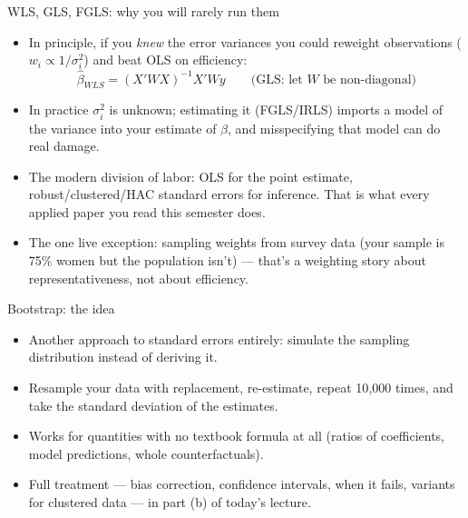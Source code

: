 \documentclass[aspectratio=169,11pt]{beamer}
\begin{document}
\begin{frame}{WLS, GLS, FGLS: why you will rarely run them}
\begin{itemize}
	\item In principle, if you \emph{knew} the error variances you could reweight
	observations ($w_i \propto 1/\sigma_i^2$) and beat OLS on efficiency:\[
	\widehat{\beta}_{WLS} = (X' W X)^{-1} X' W y
	\qquad \text{(GLS: let $W$ be non-diagonal)}
	\]

	\item In practice $\sigma_i^2$ is unknown; estimating it (FGLS/IRLS) imports a
	model of the variance into your estimate of $\beta$, and misspecifying that model
	can do real damage.

	\item The modern division of labor: \alert{OLS for the point estimate,
	robust/clustered/HAC standard errors for inference}. That is what every applied
	paper you read this semester does.

	\item The one live exception: \alert{sampling weights} from survey data
	(your sample is 75\% women but the population isn't) --- that's a weighting
	story about representativeness, not about efficiency.
\end{itemize}
\end{frame}



\begin{frame}{Bootstrap: the idea}
\begin{itemize}
	\item Another approach to standard errors entirely: \alert{simulate the sampling
	distribution} instead of deriving it.

	\item Resample your data with replacement, re-estimate, repeat 10{,}000 times,
	and take the standard deviation of the estimates.

	\item Works for quantities with no textbook formula at all (ratios of
	coefficients, model predictions, whole counterfactuals).

	\item Full treatment --- bias correction, confidence intervals, when it fails,
	variants for clustered data --- in part (b) of today's lecture.
\end{itemize}
\end{frame}
\end{document}
